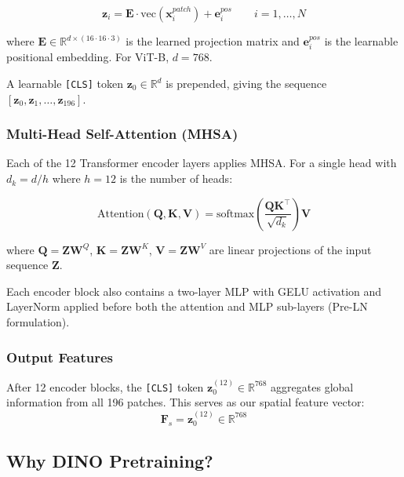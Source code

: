 \documentclass[12pt,a4paper]{article}
\begin{document}
\begin{equation}
  \mathbf{z}_i = \mathbf{E} \cdot \text{vec}(\mathbf{x}_i^{patch}) + \mathbf{e}_i^{pos}
  \qquad i = 1, \ldots, N
\end{equation}

where $\mathbf{E} \in \mathbb{R}^{d \times (16 \cdot 16 \cdot 3)}$ is the learned
projection matrix and $\mathbf{e}_i^{pos}$ is the learnable positional embedding.
For ViT-B, $d = 768$.

A learnable \texttt{[CLS]} token $\mathbf{z}_0 \in \mathbb{R}^d$ is prepended, giving
the sequence $[\mathbf{z}_0, \mathbf{z}_1, \ldots, \mathbf{z}_{196}]$.

\subsubsection{Multi-Head Self-Attention (MHSA)}

Each of the 12 Transformer encoder layers applies MHSA. For a single head with
$d_k = d/h$ where $h = 12$ is the number of heads:

\begin{equation}
  \text{Attention}(\mathbf{Q}, \mathbf{K}, \mathbf{V}) =
  \text{softmax}\!\left(\frac{\mathbf{Q}\mathbf{K}^\top}{\sqrt{d_k}}\right)\mathbf{V}
\end{equation}

where $\mathbf{Q} = \mathbf{Z}\mathbf{W}^Q$, $\mathbf{K} = \mathbf{Z}\mathbf{W}^K$,
$\mathbf{V} = \mathbf{Z}\mathbf{W}^V$ are linear projections of the input sequence
$\mathbf{Z}$.

Each encoder block also contains a two-layer MLP with GELU activation and LayerNorm
applied before both the attention and MLP sub-layers (Pre-LN formulation).

\subsubsection{Output Features}

After 12 encoder blocks, the \texttt{[CLS]} token $\mathbf{z}_0^{(12)} \in \mathbb{R}^{768}$
aggregates global information from all 196 patches. This serves as our spatial feature
vector:
\begin{equation}
  \mathbf{F}_s = \mathbf{z}_0^{(12)} \in \mathbb{R}^{768}
\end{equation}

\subsection{Why DINO Pretraining?}
\end{document}
